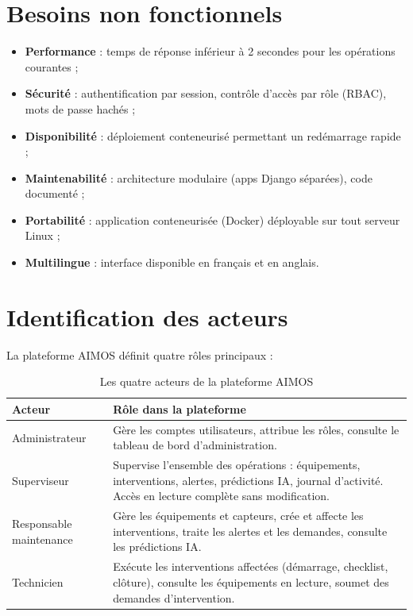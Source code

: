 \section{Besoins non fonctionnels}
\begin{itemize}
    \item \textbf{Performance} : temps de réponse inférieur à 2 secondes pour les opérations courantes ;
    \item \textbf{Sécurité} : authentification par session, contrôle d'accès par rôle (RBAC), mots de passe hachés ;
    \item \textbf{Disponibilité} : déploiement conteneurisé permettant un redémarrage rapide ;
    \item \textbf{Maintenabilité} : architecture modulaire (apps Django séparées), code documenté ;
    \item \textbf{Portabilité} : application conteneurisée (Docker) déployable sur tout serveur Linux ;
    \item \textbf{Multilingue} : interface disponible en français et en anglais.
\end{itemize}

\section{Identification des acteurs}
La plateforme AIMOS définit quatre rôles principaux :

\begin{table}[H]
\centering
\renewcommand{\arraystretch}{1.4}
\begin{tabular}{@{}p{}p{}@{}}
\hline
\textbf{Acteur} & \textbf{Rôle dans la plateforme} \\
\hline
Administrateur & Gère les comptes utilisateurs, attribue les rôles, consulte le tableau de bord d'administration. \\
\hline
Superviseur & Supervise l'ensemble des opérations : équipements, interventions, alertes, prédictions IA, journal d'activité. Accès en lecture complète sans modification. \\
\hline
Responsable maintenance & Gère les équipements et capteurs, crée et affecte les interventions, traite les alertes et les demandes, consulte les prédictions IA. \\
\hline
Technicien & Exécute les interventions affectées (démarrage, checklist, clôture), consulte les équipements en lecture, soumet des demandes d'intervention. \\
\hline
\end{tabular}
\caption{Les quatre acteurs de la plateforme AIMOS}
\end{table}

